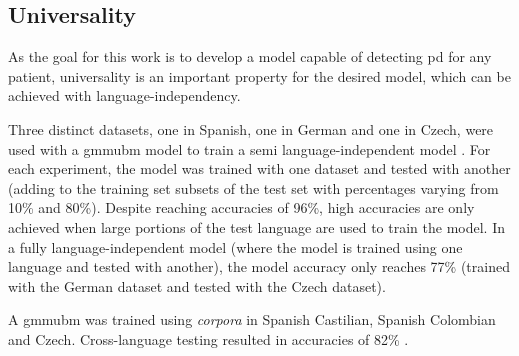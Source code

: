 \subsection{Universality}

As the goal for this work is to develop a model capable of detecting \gls{pd} for any patient, universality is an important property for the desired model, which can be achieved with language-independency. 

Three distinct datasets, one in Spanish, one in German and one in Czech, were used with a \gls{gmmubm} model to train a semi language-independent model \cite{parkinson_three_languages}. For each experiment, the model was trained with one dataset and tested with another (adding to the training set subsets of the test set with percentages varying from 10\% and 80\%). Despite reaching accuracies of 96\%, high accuracies are only achieved when large portions of the test language are used to train the model. In a fully language-independent model (where the model is trained using one language and tested with another), the model accuracy only reaches 77\% (trained with the German dataset and tested with the Czech dataset).

A \gls{gmmubm} was trained using \textit{corpora} in Spanish Castilian, Spanish Colombian and Czech. Cross-language testing resulted in accuracies of 82\% \cite{parkinson_phonemic_relevance}.

